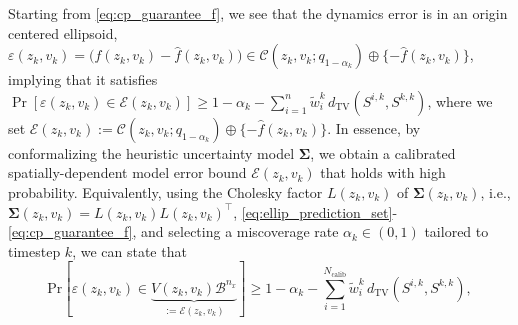 \documentclass{l4dc2026}
\newcommand{\tvd}{d_\textrm{TV}}
\begin{document}
\noindent Starting from \eqref{eq:cp_guarantee_f}, we see that the dynamics error is in an origin centered ellipsoid, $\varepsilon(z_k,v_k) = \big(f(z_k,v_k) - \hat f(z_k, v_k) \big) \in \mathcal{C}(z_k, v_k; q_{1-\alpha_k}) \oplus \{-\hat f(z_k, v_k)\}$, implying that it satisfies $\Pr[\varepsilon(z_k,v_k) \in \mathcal{E}(z_k,v_k)] \geq 1 - \alpha_k -\sum_{i=1}^{n}\tilde{w}_i^k\,\tvd(S^{i,k}, S^{k,k}) $, where we set $\mathcal{E}(z_k, v_k) := \mathcal{C}(z_k, v_k; q_{1-\alpha_k}) \oplus \{-\hat f(z_k, v_k)\}$. In essence, by conformalizing the heuristic uncertainty model $\mathbf{\Sigma}$, we obtain a calibrated spatially-dependent model error bound $\mathcal{E}(z_k, v_k)$ that holds with high probability. 
Equivalently, using the Cholesky factor $L(z_k,v_k)$ of $\mathbf{\Sigma}(z_k,v_k)$, i.e., $\mathbf{\Sigma}(z_k,v_k) = L(z_k,v_k)L(z_k,v_k)^\top$, \eqref{eq:ellip_prediction_set}-\eqref{eq:cp_guarantee_f}, and selecting a miscoverage rate $\alpha_k \in (0,1)$ tailored to timestep $k$, we can state that
\begin{equation}\label{eq:ball_form}\textstyle
\textrm{Pr}[\varepsilon(z_k,v_k) \in \underbrace{V(z_k,v_k)\mathcal{B}^{n_x}}_{:=\mathcal{E}(z_k,v_k)}] \ge 1 - \alpha_k -\sum_{i=1}^{N_\textrm{calib}}\tilde{w}_i^k\,\tvd(S^{i,k}, S^{k,k}),
\end{equation}\vspace{-22pt}
\end{document}
